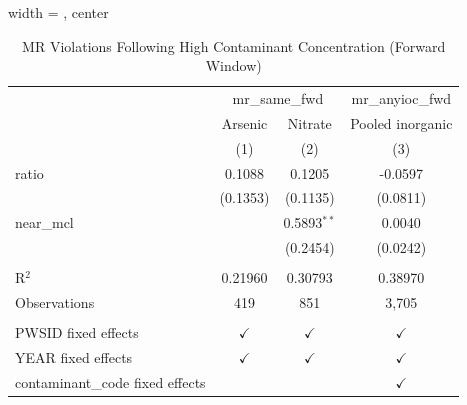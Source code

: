 
\begin{table}[htbp]
   
   \caption{\label{tab:mr_concentration_lag} MR Violations Following High Contaminant Concentration (Forward Window)}
   \bigskip
   
   \centering
   
   \begin{adjustbox}{width = \textwidth, center}
      
      
      \begin{tabular}{lccc}
         \toprule
         
          & \multicolumn{2}{c}{mr\_same\_fwd} & mr\_anyioc\_fwd\\
         
                                          & Arsenic       & Nitrate       & Pooled inorganic \\   
         
                                          & (1)           & (2)           & (3)\\  
         
         \midrule 
         ratio                            & 0.1088        & 0.1205        & -0.0597\\   
                                          & (0.1353)      & (0.1135)      & (0.0811)\\   
         near\_mcl                        &               & 0.5893$^{**}$ & 0.0040\\   
                                          &               & (0.2454)      & (0.0242)\\   
         
          \\
         
         R$^2$                            & 0.21960       & 0.30793       & 0.38970\\  
         Observations                     & 419           & 851           & 3,705\\  
         
          \\
         
         PWSID fixed effects              & $\checkmark$  & $\checkmark$  & $\checkmark$\\   
         YEAR fixed effects               & $\checkmark$  & $\checkmark$  & $\checkmark$\\   
         contaminant\_code fixed effects  &               &               & $\checkmark$\\   
         

\end{tabular}
\end{adjustbox}
\end{table}
